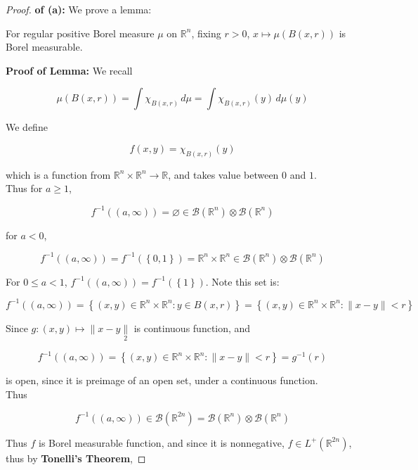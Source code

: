 \documentclass{qlnotes-export}
\begin{document}
\begin{proof}

\textbf{of (a):} We prove a lemma:

\begin{lemma}

For regular positive Borel measure \(\mu\) on \({\mathbb{R}}^{n}\), fixing \(r > 0\), \(x\mapsto\mu(B(x,r))\) is Borel measurable.

\end{lemma}

\textbf{Proof of Lemma:} We recall

\[\mu(B(x,r)) = \int\chi_{B(x,r)}\, d\mu = \int\chi_{B(x,r)}(y)\, d\mu(y)\]

We define

\[f(x,y) = \chi_{B(x,r)}(y)\]

which is a function from \({\mathbb{R}}^{n} \times {\mathbb{R}}^{n}\rightarrow{\mathbb{R}}\), and takes value between \(0\) and \(1\).\\
Thus for \(a \geq 1\),

\[f^{- 1}((a,\infty)) = \varnothing \in \mathcal{B}({\mathbb{R}}^{n}) \otimes \mathcal{B}({\mathbb{R}}^{n})\]

for \(a < 0\),

\[f^{- 1}((a,\infty)) = f^{- 1}(\left\{ {0,1} \right\}) = {\mathbb{R}}^{n} \times {\mathbb{R}}^{n} \in \mathcal{B}({\mathbb{R}}^{n}) \otimes \mathcal{B}({\mathbb{R}}^{n})\]

For \(0 \leq a < 1\), \(f^{- 1}((a,\infty)) = f^{- 1}(\left\{ 1 \right\})\). Note this set is:

\[f^{- 1}((a,\infty)) = \left\{ {(x,y) \in {\mathbb{R}}^{n} \times {\mathbb{R}}^{n}:y \in B(x,r)} \right\} = \left\{ {(x,y) \in {\mathbb{R}}^{n} \times {\mathbb{R}}^{n}: \parallel x - y \parallel < r} \right\}\]

Since \(g:(x,y)\mapsto \parallel x - y\underset{2}{\parallel}\) is continuous function, and

\[f^{- 1}((a,\infty)) = \left\{ {(x,y) \in {\mathbb{R}}^{n} \times {\mathbb{R}}^{n}: \parallel x - y \parallel < r} \right\} = g^{- 1}(r)\]

is open, since it is preimage of an open set, under a continuous function.\\
Thus

\[f^{- 1}((a,\infty)) \in \mathcal{B}({\mathbb{R}}^{2n}) = \mathcal{B}({\mathbb{R}}^{n}) \otimes \mathcal{B}({\mathbb{R}}^{n})\]

Thus \(f\) is Borel measurable function, and since it is nonnegative, \(f \in L^{+}({\mathbb{R}}^{2n})\), thus by \textbf{Tonelli's Theorem},


\end{proof}
\end{document}
